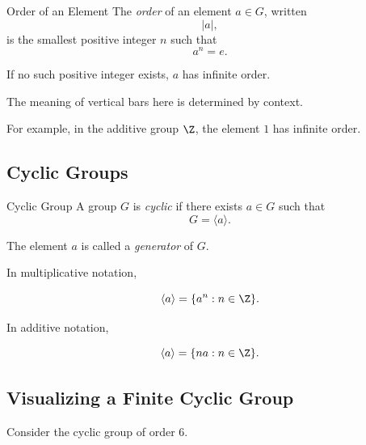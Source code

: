 \begin{definitionbox}{Order of an Element}
The \emph{order} of an element \(a\in G\), written
\[ |a|, \]
is the smallest positive integer \(n\) such that
\[ a^n=e. \]

If no such positive integer exists, \(a\) has infinite order.
\end{definitionbox}

The meaning of vertical bars here is determined by context.

For example, in the additive group \(\Z\), the element \(1\) has infinite
order.

\subsection{Cyclic Groups}
\label{subsec:cyclic-groups}

\begin{definitionbox}{Cyclic Group}
A group \(G\) is \emph{cyclic} if there exists \(a\in G\) such that
\[ G=\langle a\rangle. \]

The element \(a\) is called a \emph{generator} of \(G\).
\end{definitionbox}

In multiplicative notation,

\[ \langle a\rangle=\{a^n:n\in\Z\}. \]

In additive notation,

\[ \langle a\rangle=\{na:n\in\Z\}. \]

\subsection{Visualizing a Finite Cyclic Group}
\label{subsec:visual-cyclic-group}

Consider the cyclic group of order \(6\).

\begin{center}
\end{center}

